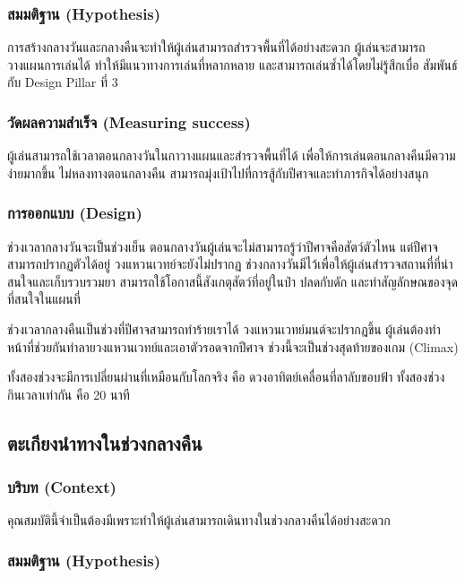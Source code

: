 \subsubsection{สมมติฐาน (Hypothesis)}

การสร้างกลางวันและกลางคืนจะทำให้ผู้เล่นสามารถสำรวจพื้นที่ได้อย่างสะดวก ผู้เล่นจะสามารถวางแผนการเล่นได้ ทำให้มีแนวทางการเล่นที่หลากหลาย และสามารถเล่นซ้ำได้โดยไม่รู้สึกเบื่อ สัมพันธ์กับ Design Pillar ที่ 3

\subsubsection{วัดผลความสำเร็จ (Measuring success)}

ผู้เล่นสามารถใช้เวลาตอนกลางวันในกาวางแผนและสำรวจพื้นที่ได้ เพื่อให้การเล่นตอนกลางคืนมีความง่ายมากขึ้น ไม่หลงทางตอนกลางคืน สามารถมุ่งเป้าไปที่การสู้กับปีศาจและทำภารกิจได้อย่างสนุก

\subsubsection{การออกแบบ (Design)}

ช่วงเวลากลางวันจะเป็นช่วงเย็น ตอนกลางวันผู้เล่นจะไม่สามารถรู้ว่าปีศาจคือสัตว์ตัวไหน แต่ปีศาจสามารถปรากฏตัวได้อยู่ วงแหวนเวทย์จะยังไม่ปรากฏ ช่วงกลางวันมีไว้เพื่อให้ผู้เล่นสำรวจสถานที่ที่น่าสนใจและเก็บรวบรวมยา สามารถใช้โอกาสนี้สังเกตุสัตว์ที่อยู่ในป่า ปลดกับดัก และทำสัญลักษณของจุดที่สนใจในแผนที่

ช่วงเวลากลางคืนเป็นช่วงที่ปีศาจสามารถทำร้ายเราได้ วงแหวนเวทย์มนต์จะปรากฏขึ้น ผู้เล่นต้องทำหน้าที่ช่วยกันทำลายวงแหวนเวทย์และเอาตัวรอดจากปีศาจ ช่วงนี้จะเป็นช่วงสุดท้ายของเกม (Climax)

ทั้งสองช่วงจะมีการเปลี่ยนผ่านที่เหมือนกับโลกจริง คือ ดวงอาทิตย์เคลื่อนที่ลาลับขอบฟ้า ทั้งสองช่วงกินเวลาเท่ากัน คือ 20 นาที

\subsection{ตะเกียงนำทางในช่วงกลางคืน}
\subsubsection{บริบท (Context)}

คุณสมบัตินี้จำเป็นต้องมีเพราะทำให้ผู้เล่นสามารถเดินทางในช่วงกลางคืนได้อย่างสะดวก

\subsubsection{สมมติฐาน (Hypothesis)}

